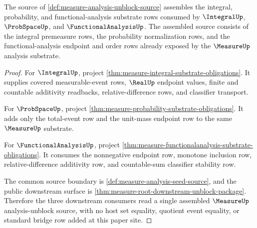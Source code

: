 \begin{theorem}
\label{thm:measure-analysis-unblock-downstream-source}
The source of \autoref{def:measure-analysis-unblock-source} assembles the
integral, probability, and functional-analysis substrate rows consumed by
$\IntegralUp$, $\ProbSpaceUp$, and $\FunctionalAnalysisUp$. The assembled
source consists of the integral premeasure rows, the probability
normalization rows, and the functional-analysis endpoint and order rows
already exposed by the $\MeasureUp$ analysis substrate.
\end{theorem}
\begin{proof}
For $\IntegralUp$, project
\autoref{thm:measure-integral-substrate-obligations}. It supplies covered
measurable-event rows, $\RealUp$ endpoint values, finite and countable
additivity readbacks, relative-difference rows, and classifier transport.

For $\ProbSpaceUp$, project
\autoref{thm:measure-probability-substrate-obligations}. It adds only the
total-event row and the unit-mass endpoint row to the same $\MeasureUp$
substrate.

For $\FunctionalAnalysisUp$, project
\autoref{thm:measure-functionalanalysis-substrate-obligations}. It consumes
the nonnegative endpoint row, monotone inclusion row, relative-difference
additivity row, and countable-sum classifier stability row.

The common source boundary is
\autoref{def:measure-analysis-seed-source}, and the public downstream
surface is \autoref{thm:measure-root-downstream-unblock-package}. Therefore
the three downstream consumers read a single assembled $\MeasureUp$
analysis-unblock source, with no host set equality, quotient event equality,
or standard bridge row added at this paper site.
\end{proof}

